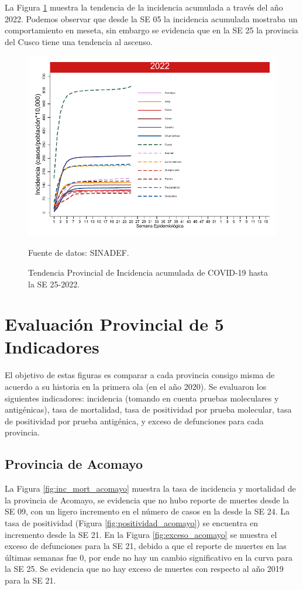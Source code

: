 \documentclass[12pt,a4paper,openany]{book}
\begin{document}
	La Figura \ref{fig:incidencia_provincial} muestra la tendencia de la incidencia acumulada a través del año 2022. Podemos observar que desde la SE 05 la incidencia acumulada mostraba un comportamiento en meseta, sin embargo se evidencia que en la SE 25 la provincia del Cusco tiene una tendencia al ascenso.
	
	\begin{figure}[h]
		\caption{Tendencia Provincial de Incidencia acumulada de COVID-19 hasta la SE 25-2022. }\label{fig:incidencia_provincial}
		\begin{center}
			\includegraphics[width=0.60\linewidth]{../figuras/incidencia_provincial_acumulada_2022.pdf}
		\end{center}
		{\footnotesize {Fuente de datos: SINADEF.}}
	\end{figure}
	
	\clearpage
	
	\section*{Evaluación Provincial de 5 Indicadores}
	\noindent El objetivo de estas figuras es comparar a cada provincia consigo misma de acuerdo a su historia  en la primera ola (en el año 2020). Se evaluaron los siguientes indicadores: incidencia (tomando en cuenta pruebas moleculares y antigénicas), tasa de mortalidad, tasa de positividad por prueba molecular, tasa de positividad por prueba antigénica, y exceso de defunciones para cada provincia.
	
	\subsection*{Provincia de Acomayo}
	\noindent La Figura \ref{fig:inc_mort_acomayo} muestra la tasa de incidencia y mortalidad de la provincia de Acomayo, se evidencia que no hubo reporte de muertes desde la SE 09, con un ligero incremento en el número de casos en la desde la SE 24. La tasa de positividad (Figura \ref{fig:positividad_acomayo}) se encuentra en incremento desde la SE 21. En la Figura \ref{fig:exceso_acomayo} se muestra el exceso de defunciones para la SE 21, debido a que el reporte de muertes en las últimas semanas fue 0, por ende no hay un cambio significativo en la curva para la SE 25. Se evidencia que no hay exceso de muertes con respecto al año 2019 para la SE 21.
	
\end{document}
